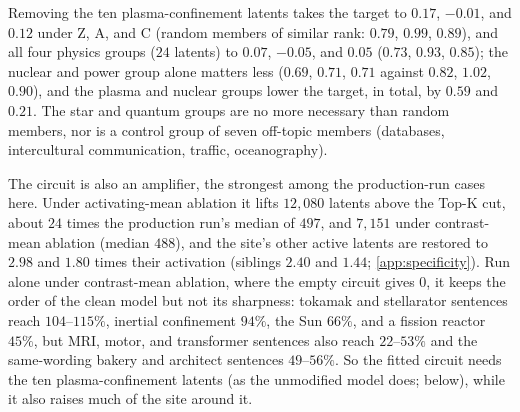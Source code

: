 \documentclass[10pt]{article}
\begin{document}
Removing the ten plasma-confinement latents takes the target to $0.17$, $-0.01$, and $0.12$ under Z, A, and C (random members of similar rank: $0.79$, $0.99$, $0.89$), and all four physics groups ($24$ latents) to $0.07$, $-0.05$, and $0.05$ ($0.73$, $0.93$, $0.85$); the nuclear and power group alone matters less ($0.69$, $0.71$, $0.71$ against $0.82$, $1.02$, $0.90$), and the plasma and nuclear groups lower the target, in total, by $0.59$ and $0.21$.
The star and quantum groups are no more necessary than random members, nor is a control group of seven off-topic members (databases, intercultural communication, traffic, oceanography).

The circuit is also an amplifier, the strongest among the production-run cases here.
Under activating-mean ablation it lifts $12{,}080$ latents above the Top-K cut, about $24$ times the production run's median of $497$, and $7{,}151$ under contrast-mean ablation (median $488$), and the site's other active latents are restored to $2.98$ and $1.80$ times their activation (siblings $2.40$ and $1.44$; \cref{app:specificity}).
Run alone under contrast-mean ablation, where the empty circuit gives $0$, it keeps the order of the clean model but not its sharpness: tokamak and stellarator sentences reach $104$--$115\%$, inertial confinement $94\%$, the Sun $66\%$, and a fission reactor $45\%$, but MRI, motor, and transformer sentences also reach $22$--$53\%$ and the same-wording bakery and architect sentences $49$--$56\%$.
So the fitted circuit needs the ten plasma-confinement latents (as the unmodified model does; below), while it also raises much of the site around it.
\end{document}
